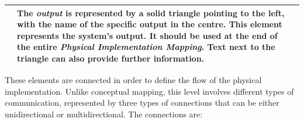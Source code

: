 \begin{longtable}{|m{}|m{}|m{}|}
    & 
    The \textit{output} is represented by a solid triangle pointing to the left, with the name of the specific output in the centre. This element represents the system's output. It should be used at the end of the entire \textit{Physical Implementation Mapping}. Text next to the triangle can also provide further information.
    \\\hline
\end{longtable}

These elements are connected in order to define the flow of the physical implementation. Unlike conceptual mapping, this level involves different types of communication, represented by three types of connections that can be either unidirectional or multidirectional. The connections are:

